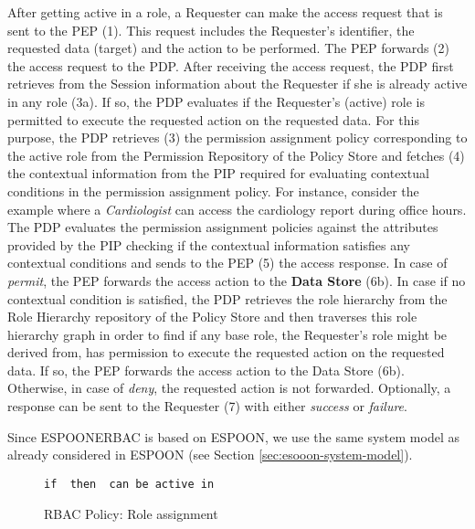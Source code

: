 \documentclass[epsfig,a4paper,11pt,titlepage]{book}
\numberwithin{algorithm}{chapter}
\newcommand{\Keywords}{\lstset{keywords={if,then,can,be,active,in,execute}}}
\begin{document}
After getting active in a role, a Requester can make the access request that is sent to the \gls{PEP} (1). This request includes the Requester's identifier, the requested data (target) and the action to be performed. The \gls{PEP} forwards (2) the access request to the \gls{PDP}. After receiving the access request, the \gls{PDP} first retrieves from the Session information about the Requester if she is already active in any role (3a). If so, the \gls{PDP} evaluates if the Requester's (active) role is permitted to execute the requested action on the requested data. For this purpose, the \gls{PDP} retrieves (3) the permission assignment policy corresponding to the active role from the Permission Repository of the Policy Store and fetches (4) the contextual information from the \gls{PIP} required for evaluating contextual conditions in the permission assignment policy. For instance, consider the example where a \emph{Cardiologist} can access the cardiology report during office hours. The \gls{PDP} evaluates the permission assignment policies against the attributes provided by the \gls{PIP} checking if the contextual information satisfies any contextual conditions and sends to the \gls{PEP} (5) the access response. In case of \emph{permit}, the \gls{PEP} forwards the access action to the \textbf{Data Store} (6b). In case if no contextual condition is satisfied, the \gls{PDP} retrieves the role hierarchy from the Role Hierarchy repository of the Policy Store and then traverses this role hierarchy graph in order to find if any base role, the Requester's role might be derived from, has permission to execute the requested action on the requested data. If so, the \gls{PEP} forwards the access action to the Data Store (6b). Otherwise, in case of \emph{deny}, the requested action is not forwarded. Optionally, a response can be sent to the Requester (7) with either \emph{success} or \emph{failure}.

Since \gls{ESPOONERBAC} is based on \gls{ESPOON}, we use the same system model as already considered in \gls{ESPOON} (see Section \ref{sec:esooon-system-model}).

\begin{figure} [htp]
\Keywords
\begin{lstlisting}[style=AMMA,numbers=none,breaklines,mathescape,rulesepcolor=\color{black}]
if  then  can be active in 

\end{lstlisting}
\caption[RBAC Policy: Role assignment]{\gls{RBAC} Policy: Role assignment}
\label{fig:erbac-policy-role-assignment}
\end{figure}
\end{document}
